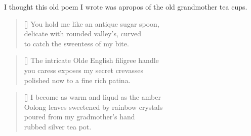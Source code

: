 I thought this old poem I wrote was apropos of the old grandmother tea cups.

\settowidth{\versewidth}{Oolong leaves sweetened by rainbow crystals}
\begin{verse}[\versewidth]
You hold me like an antique sugar spoon,\\
delicate with rounded valley's, curved\\
to catch the sweentess of my bite.
\end{verse}
\begin{verse}[\versewidth]
The intricate Olde English filigree handle\\
you caress exposes my secret crevasses\\
polished now to a fine rich patina.
\end{verse}
\begin{verse}[\versewidth]
I become as warm and liqud as the amber\\
Oolong leaves sweetened by rainbow crystals\\
poured from my gradmother's hand\\
rubbed silver tea pot.
\end{verse}
